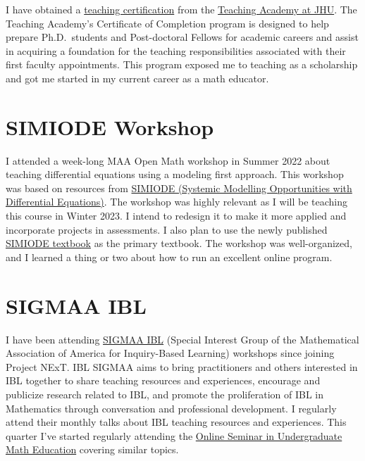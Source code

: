 \documentclass[
]{report}
\begin{document}
I have obtained a \href{https://ctei.jhu.edu/teaching-academy/coc}{teaching certification} from the
\href{https://ctei.jhu.edu/teaching-academy}{Teaching Academy at JHU}.
The Teaching Academy's Certificate of Completion program is designed to help prepare Ph.D.~students and Post-doctoral Fellows for academic careers and assist in acquiring a foundation for the teaching responsibilities associated with their first faculty appointments.
This program exposed me to teaching as a scholarship and got me started in my current career as a math educator.

\hypertarget{simiode-workshop}{%
\section{SIMIODE Workshop}\label{simiode-workshop}}

I attended a week-long MAA Open Math workshop in Summer 2022 about teaching differential equations using a modeling first approach.
This workshop was based on resources from \href{https://qubeshub.org/community/groups/simiode}{SIMIODE (Systemic Modelling Opportunities with Differential Equations)}. The workshop was highly relevant as I will be teaching this course in Winter 2023. I intend to redesign it to make it more applied and incorporate projects in assessments. I also plan to use the newly published \href{https://qubeshub.org/community/groups/simiode/textbook}{SIMIODE textbook} as the primary textbook.
The workshop was well-organized, and I learned a thing or two about how to run an excellent online program.

\hypertarget{sigmaa-ibl}{%
\section{SIGMAA IBL}\label{sigmaa-ibl}}

I have been attending \href{http://sigmaa.maa.org/ibl/}{SIGMAA IBL} (Special Interest Group of the Mathematical Association of America for Inquiry-Based Learning) workshops since joining Project NExT.
IBL SIGMAA aims to bring practitioners and others interested in IBL together to share teaching resources and experiences, encourage and publicize research related to IBL, and promote the proliferation of IBL in Mathematics through conversation and professional development.
I regularly attend their monthly talks about IBL teaching resources and experiences.
This quarter I've started regularly attending the \href{https://olsume.org/}{Online Seminar in Undergraduate Math Education} covering similar topics.
\end{document}
